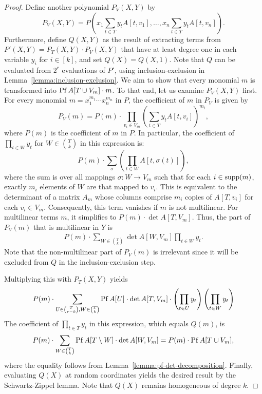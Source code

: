 \begin{proof}
  Define another polynomial $P_V(X, Y)$ by
  \[
    P_V(X,Y) = P\left(x_1 \sum_{t \in T} y_t A[t,v_1], \ldots, x_n \sum_{t \in T} y_t A[t, v_n]\right).
  \]
  Furthermore, define $Q(X,Y)$ as the result of extracting terms from $P'(X, Y) = P_T(X, Y) \cdot P_V(X, Y)$ that have at least degree one in each variable $y_i$ for $i \in [k]$,
  and set $Q(X)=Q(X,1)$.
  Note that $Q$ can be evaluated from $2^r$ evaluations of $P'$, using inclusion-exclusion in Lemma~\ref{lemma:inclusion-exclusion}.
  We aim to show that every monomial $m$ is transformed into $\operatorname{Pf} A[T \cup V_m] \cdot m$.
  To that end, let us examine $P_V(X, Y)$ first.
  For every monomial $m=x_1^{m_1} \cdots x_n^{m_n}$ in $P$,
  the coefficient of $m$ in $P_V$ is given by
  \[
    P_V(m) = P(m) \cdot \prod_{v_i \in V_m} \left( \sum_{t \in T} y_t A[t, v_i]\right)^{m_i},
  \]
  where $P(m)$ is the coefficient of $m$ in $P$.
  In particular, the coefficient of $\prod_{t \in W} y_t$ for $W \in \binom{T}{k}$ in this expression is:
  \[
  P(m) \cdot \sum_{\sigma} \left( \prod_{t \in W} A[t, \sigma(t)] \right),
  \]
  where the sum is over all mappings $\sigma \colon W \to V_m$ such that for each $i \in \operatorname{supp}(m)$, exactly $m_i$ elements of $W$ are that mapped to $v_i$.
  This is equivalent to the determinant of a matrix $A_m$ whose columns comprise $m_i$ copies of $A[T, v_i]$ for each $v_i \in V_m$.
  Consequently, this term vanishes if $m$ is not multilinear.
  For multilinear terms $m$, it simplifies to $P(m) \cdot \det A[T, V_m]$.
  Thus, the part of $P_V(m)$ that is multilinear in $Y$ is
  \begin{align*}
    P(m) \cdot \sum_{W \in \binom{T}{k}} \det A[W, V_m] \prod_{t \in W} y_t.
  \end{align*}
  Note that the non-multilinear part of $P_V(m)$ is irrelevant since it will be excluded from $Q$ in the inclusion-exclusion step.
  
  Multiplying this with $P_T(X, Y)$ yields
  \begin{align*}
    P(m) \cdot \sum_{U \in \binom{T}{r - k}, W \in \binom{T}{k}} \operatorname{Pf} A[U] \cdot \det A[T, V_m] \cdot \left(\prod_{t \in U} y_t \right) \left(\prod_{t \in W} y_t \right)
  \end{align*}
  The coefficient of $\prod_{t \in T} y_t$ in this expression, which equals $Q(m)$, is
  \begin{align*}
    P(m) \cdot \sum_{W \in \binom{T}{k}} \operatorname{Pf} A[T \setminus W] \cdot \det A[W, V_m] = P(m) \cdot \operatorname{Pf} A[T \cup V_m],
  \end{align*}
  where the equality follows from Lemma~\ref{lemma:pf-det-decomposition}.
  Finally, evaluating $Q(X)$ at random coordinates yields the desired result by the Schwartz-Zippel lemma.
  Note that $Q(X)$ remains homogeneous of degree $k$. 
\end{proof}

